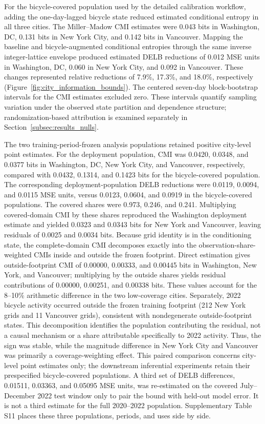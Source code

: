 \documentclass[applsci,article,accept,moreauthors]{Definitions/mdpi}
\newcommand{\DCCMI}{0.043}
\newcommand{\DCDeltaL}{0.012}
\newcommand{\DCRelativeL}{7.9\%}
\newcommand{\NYCMI}{0.131}
\newcommand{\NYDeltaL}{0.060}
\newcommand{\NYRelativeL}{17.3\%}
\newcommand{\VANCMI}{0.142}
\newcommand{\VANDeltaL}{0.092}
\newcommand{\VANRelativeL}{18.0\%}
\begin{document}
For the bicycle-covered population used by the detailed calibration
workflow, adding the one-day-lagged bicycle state reduced estimated
conditional entropy in all three cities. The Miller--Madow CMI
estimates were \DCCMI{} bits in Washington, DC, \NYCMI{} bits in New York City,
and \VANCMI{} bits in Vancouver.
Mapping the baseline and bicycle-augmented conditional entropies through the
same inverse integer-lattice envelope produced estimated DELB reductions of
\DCDeltaL{} MSE units in Washington, DC, \NYDeltaL{} in New York City, and
\VANDeltaL{} in Vancouver. These changes represented relative reductions of
\DCRelativeL, \NYRelativeL, and \VANRelativeL, respectively
(Figure~\ref{fig:city_information_bounds}).
The centered seven-day block-bootstrap intervals for the CMI estimates
excluded zero. These intervals quantify sampling variation under the
observed state partition and dependence structure; randomization-based
attribution is examined separately in Section~\ref{subsec:results_nulls}.

The two training-period-frozen analysis populations retained
positive city-level point estimates.
For the deployment population, CMI was 0.0420, 0.0348, and 0.0377 bits in
Washington, DC, New York City, and Vancouver, respectively, compared with
0.0432, 0.1314, and 0.1423 bits for the bicycle-covered population. The
corresponding deployment-population DELB reductions were 0.0119, 0.0094, and
0.0115 MSE units, versus 0.0123, 0.0604, and 0.0919 in the bicycle-covered
populations. {The covered shares were 0.973, 0.246, and 0.241. Multiplying
covered-domain CMI by these shares reproduced the Washington deployment
estimate and yielded 0.0323 and 0.0343 bits for New York and Vancouver,
leaving residuals of 0.0025 and 0.0034 bits. Because grid identity is in the
conditioning state, the complete-domain CMI decomposes exactly into the
observation-share-weighted CMIs inside and outside the frozen footprint.
Direct estimation gives outside-footprint CMI of 0.00000, 0.00333, and
0.00445 bits in Washington, New York, and Vancouver; multiplying by the
outside shares yields residual contributions of 0.00000, 0.00251, and
0.00338 bits. These values account for the 8--10\% arithmetic difference
in the two low-coverage cities. Separately, 2022 bicycle activity occurred
outside the frozen training footprint (212 New York grids and 11 Vancouver
grids), consistent with nondegenerate outside-footprint states. This
decomposition identifies the population contributing the residual, not a
causal mechanism or a share attributable specifically to 2022 activity.}
Thus, the sign was stable, while
the magnitude difference in New York City and Vancouver was primarily a
coverage-weighting effect. This paired comparison concerns city-level point
estimates only; the downstream
inferential experiments retain their prespecified bicycle-covered
populations.
{A third set of DELB differences, 0.01511, 0.03363, and 0.05095 MSE
units, was re-estimated on the covered July--December 2022 test window only
to pair the bound with held-out model error. It is not a third estimate for
the full 2020--2022 population. Supplementary Table S11 places these three
populations, periods, and uses side by side.}
\end{document}
